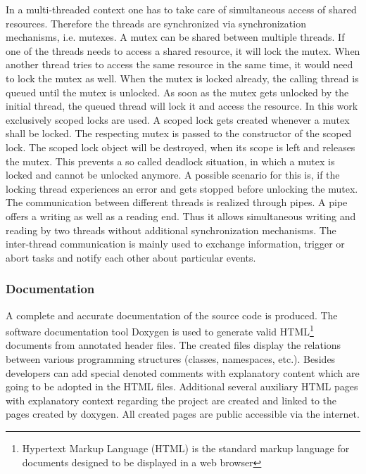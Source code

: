 In a multi-threaded context one has to take care of simultaneous access of shared resources. Therefore the threads are synchronized via synchronization mechanisms, i.e. mutexes. A mutex can be shared between multiple threads. If one of the threads needs to access a shared resource, it will lock the mutex. When another thread tries to access the same resource in the same time, it would need to lock the mutex as well. When the mutex is locked already, the calling thread is queued until the mutex is unlocked. As soon as the mutex gets unlocked by the initial thread, the queued thread will lock it and access the resource. In this work exclusively scoped locks are used. A scoped lock gets created whenever a mutex shall be locked. The respecting mutex is passed to the constructor of the scoped lock. The scoped lock object will be destroyed, when its scope is left and releases the mutex. This prevents a so called deadlock situation, in which a mutex is locked and cannot be unlocked anymore. A possible scenario for this is, if the locking thread experiences an error and gets stopped before unlocking the mutex.\\

The communication between different threads is realized through pipes. A pipe offers a writing as well as a reading end. Thus it allows simultaneous writing and reading by two threads without additional synchronization mechanisms. The inter-thread communication is mainly used to exchange information, trigger or abort tasks and notify each other about particular events.

\subsubsection{Documentation}

A complete and accurate documentation of the source code is produced. The software documentation tool Doxygen \cite{doxygen} is used to generate valid HTML\footnote{Hypertext Markup Language (HTML) is the standard markup language for documents designed to be displayed in a web browser} documents from annotated header files. The created files display the relations between various programming structures (classes, namespaces, etc.). Besides developers can add special denoted comments with explanatory content which are going to be adopted in the HTML files. Additional several auxiliary HTML pages with explanatory context regarding the project are created and linked to the pages created by doxygen. All created pages \cite{docu} are public accessible via the internet.\\

